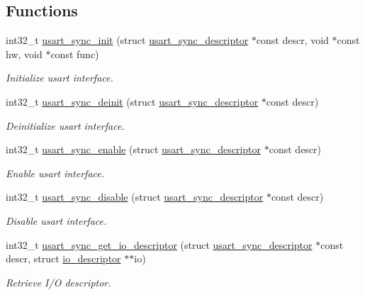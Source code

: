 \subsection*{Functions}
\begin{DoxyCompactItemize}
\item 
int32\+\_\+t \hyperlink{group__doc__driver__hal__usart__sync_gaa3cca792d7af7f180c5084af8ffd11c3}{usart\+\_\+sync\+\_\+init} (struct \hyperlink{structusart__sync__descriptor}{usart\+\_\+sync\+\_\+descriptor} $\ast$const descr, void $\ast$const hw, void $\ast$const func)
\begin{DoxyCompactList}\small\item\em Initialize usart interface. \end{DoxyCompactList}\item 
int32\+\_\+t \hyperlink{group__doc__driver__hal__usart__sync_gae8076ed0a30199bd526f1da22e2095d3}{usart\+\_\+sync\+\_\+deinit} (struct \hyperlink{structusart__sync__descriptor}{usart\+\_\+sync\+\_\+descriptor} $\ast$const descr)
\begin{DoxyCompactList}\small\item\em Deinitialize usart interface. \end{DoxyCompactList}\item 
int32\+\_\+t \hyperlink{group__doc__driver__hal__usart__sync_ga351aa9c8c94b4e8b0eb5efb1ecd74a82}{usart\+\_\+sync\+\_\+enable} (struct \hyperlink{structusart__sync__descriptor}{usart\+\_\+sync\+\_\+descriptor} $\ast$const descr)
\begin{DoxyCompactList}\small\item\em Enable usart interface. \end{DoxyCompactList}\item 
int32\+\_\+t \hyperlink{group__doc__driver__hal__usart__sync_ga76abe691b76e4b95b4e3a7d5bc79b026}{usart\+\_\+sync\+\_\+disable} (struct \hyperlink{structusart__sync__descriptor}{usart\+\_\+sync\+\_\+descriptor} $\ast$const descr)
\begin{DoxyCompactList}\small\item\em Disable usart interface. \end{DoxyCompactList}\item 
int32\+\_\+t \hyperlink{group__doc__driver__hal__usart__sync_gaf0b9c8819dc24f75e4f87f050edc81f5}{usart\+\_\+sync\+\_\+get\+\_\+io\+\_\+descriptor} (struct \hyperlink{structusart__sync__descriptor}{usart\+\_\+sync\+\_\+descriptor} $\ast$const descr, struct \hyperlink{structio__descriptor}{io\+\_\+descriptor} $\ast$$\ast$io)
\begin{DoxyCompactList}\small\item\em Retrieve I/O descriptor. \end{DoxyCompactList}\item 
$$
\end{DoxyCompactItemize}
